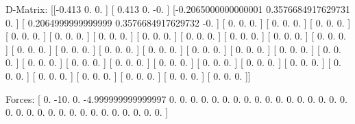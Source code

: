 D-Matrix:
[[-0.413               0.                  0.                ]
 [ 0.413               0.                 -0.                ]
 [-0.2065000000000001  0.3576684917629731  0.                ]
 [ 0.2064999999999999  0.3576684917629732 -0.                ]
 [ 0.                  0.                  0.                ]
 [ 0.                  0.                  0.                ]
 [ 0.                  0.                  0.                ]
 [ 0.                  0.                  0.                ]
 [ 0.                  0.                  0.                ]
 [ 0.                  0.                  0.                ]
 [ 0.                  0.                  0.                ]
 [ 0.                  0.                  0.                ]
 [ 0.                  0.                  0.                ]
 [ 0.                  0.                  0.                ]
 [ 0.                  0.                  0.                ]
 [ 0.                  0.                  0.                ]
 [ 0.                  0.                  0.                ]
 [ 0.                  0.                  0.                ]
 [ 0.                  0.                  0.                ]
 [ 0.                  0.                  0.                ]
 [ 0.                  0.                  0.                ]
 [ 0.                  0.                  0.                ]
 [ 0.                  0.                  0.                ]
 [ 0.                  0.                  0.                ]
 [ 0.                  0.                  0.                ]
 [ 0.                  0.                  0.                ]
 [ 0.                  0.                  0.                ]
 [ 0.                  0.                  0.                ]
 [ 0.                  0.                  0.                ]
 [ 0.                  0.                  0.                ]
 [ 0.                  0.                  0.                ]
 [ 0.                  0.                  0.                ]
 [ 0.                  0.                  0.                ]
 [ 0.                  0.                  0.                ]
 [ 0.                  0.                  0.                ]
 [ 0.                  0.                  0.                ]]

Forces:
[  0.                -10.                  0.
  -4.999999999999997   0.                  0.
   0.                  0.                  0.
   0.                  0.                  0.
   0.                  0.                  0.
   0.                  0.                  0.
   0.                  0.                  0.
   0.                  0.                  0.
   0.                  0.                  0.
   0.                  0.                  0.
   0.                  0.                  0.
   0.                  0.                  0.               ]

